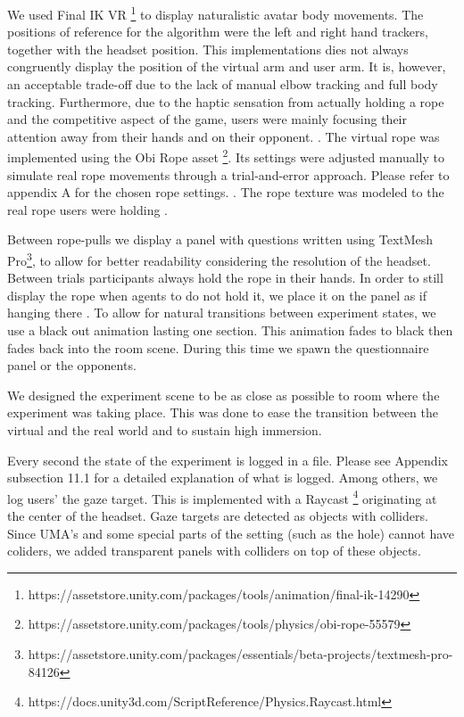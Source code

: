 We used Final IK VR \footnote{https://assetstore.unity.com/packages/tools/animation/final-ik-14290} to display naturalistic avatar body movements. The positions of reference for the algorithm were the left and right hand trackers, together with the headset position. 
This implementations dies not always congruently display the position of the virtual arm and user arm. It is, however, an acceptable trade-off due to the lack of manual elbow tracking and full body tracking. Furthermore, due to the haptic sensation from actually holding a rope and the competitive aspect of the game, users were mainly focusing their attention away from their hands and on their opponent. .
The virtual rope was implemented using the Obi Rope asset \footnote{https://assetstore.unity.com/packages/tools/physics/obi-rope-55579}. Its settings were adjusted manually to simulate real rope movements through a trial-and-error approach. Please refer to appendix A for the chosen rope settings. . The rope texture was modeled to the real rope users were holding . 

Between rope-pulls we display a panel with questions written using TextMesh Pro\footnote{https://assetstore.unity.com/packages/essentials/beta-projects/textmesh-pro-84126}, to allow for better readability considering the resolution of the headset. Between trials participants always hold the rope in their hands. In order to still display the rope when agents to do not hold it, we place it on the panel as if hanging there . To allow for natural transitions between experiment states, we use a black out animation lasting one section. This animation fades to black then fades back into the room scene. During this time we spawn the questionnaire panel or the opponents. 

We designed the experiment scene to be as close as possible to room where the experiment was taking place. This was done to ease the transition between the virtual and the real world and to sustain high immersion. 

Every second the state of the experiment is logged in a file. Please see Appendix subsection 11.1 for a detailed explanation of what is logged. Among others, we log users' the gaze target. This is implemented with a Raycast \footnote{https://docs.unity3d.com/ScriptReference/Physics.Raycast.html} originating at the center of the headset. Gaze targets are detected as objects with colliders. Since UMA's and some special parts of the setting (such as the hole) cannot have coliders, we added transparent panels with colliders on top of these objects. 


